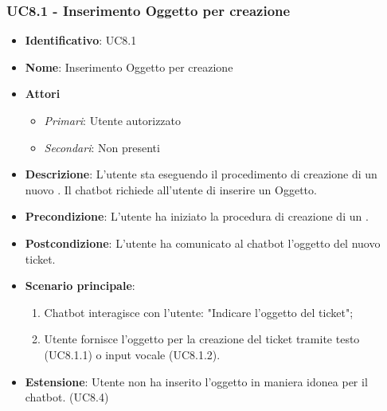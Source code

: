 \subsubsection{UC8.1 - Inserimento Oggetto per creazione }
\begin{itemize}
	\item \textbf{Identificativo}: UC8.1
	\item \textbf{Nome}: Inserimento Oggetto per creazione  
	\item \textbf{Attori}
	\begin{itemize} 
		\item \textit{Primari}: Utente autorizzato
		\item \textit{Secondari}: Non presenti
	\end{itemize}
	\item \textbf{Descrizione}: L'utente sta eseguendo il procedimento di creazione di un nuovo . Il chatbot richiede all'utente di inserire un Oggetto. 
	\item \textbf{Precondizione}: L'utente ha iniziato la procedura di creazione di un .
	\item \textbf{Postcondizione}: L'utente ha comunicato al chatbot l'oggetto del nuovo ticket.
	\item \textbf{Scenario principale}: \begin{enumerate}
		\item Chatbot interagisce con l'utente: "Indicare l'oggetto del ticket";
		\item Utente fornisce l'oggetto per la creazione del ticket tramite testo (UC8.1.1) o input vocale (UC8.1.2). 
	\end{enumerate}
	\item \textbf{Estensione}: Utente non ha inserito l'oggetto in maniera idonea per il chatbot. (UC8.4)		
\end{itemize}

